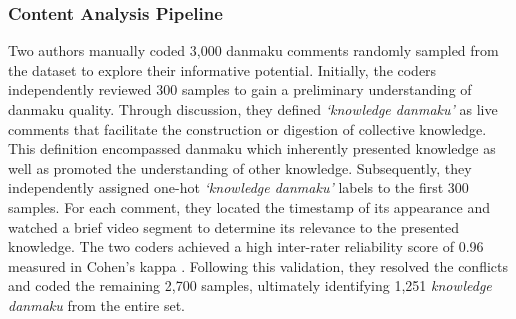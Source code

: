 \subsubsection{Content Analysis Pipeline}
Two authors manually coded 3,000 danmaku comments randomly sampled from the dataset to explore their informative potential.
Initially, the coders independently reviewed 300 samples to gain a preliminary understanding of danmaku quality. Through discussion, they defined \textit{`knowledge danmaku'} as live comments that facilitate the construction or digestion of collective knowledge. This definition encompassed danmaku which inherently presented knowledge as well as promoted the understanding of other knowledge. 
Subsequently, they independently assigned one-hot \textit{`knowledge danmaku'} labels to the first 300 samples. For each comment, they located the timestamp of its appearance and watched a brief video segment to determine its relevance to the presented knowledge. 
The two coders achieved a high inter-rater reliability score of 0.96 measured in Cohen’s kappa \cite{tavakol2011making}. 
Following this validation, they resolved the conflicts and coded the remaining 2,700 samples, ultimately identifying 1,251 \textit{knowledge danmaku} from the entire set.

